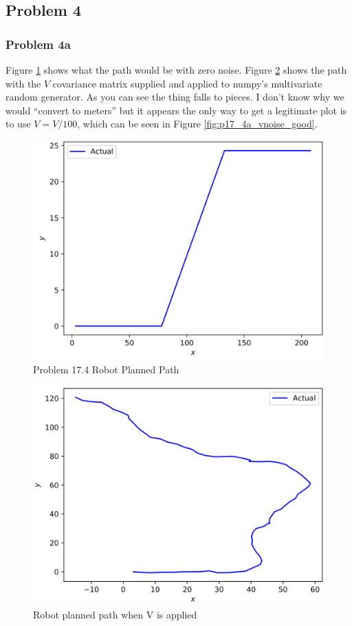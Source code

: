 \documentclass{article}
\begin{document}
\newpage
\subsection{Problem 4}
\subsubsection{Problem 4a}
Figure \ref{fig:p17_4a_planned} shows what the path would be with zero noise. 
Figure \ref{fig:p17_4a_vnoise_bad} shows the path with the $V$ covariance 
matrix supplied and applied to numpy's multivariate random generator. As you can 
see the thing falls to pieces. I don't know why we would ``convert to meters'' 
but it appears the only way to get a legitimate plot is to use $V = V / 100$, 
which can be seen in Figure \ref{fig:p17_4a_vnoise_good}.

\begin{figure}[h]
    \centering
    \includegraphics[scale=0.75]{problem17_4a_pure}
    \caption{Problem 17.4 Robot Planned Path}
    \label{fig:p17_4a_planned}
\end{figure}

\begin{figure}[h]
    \centering
    \includegraphics[scale=0.75]{problem17_4a_Vnoise_bad}
    \caption[Problem 17.4 Robot Planned Path]{Robot planned path when V is applied}
    \label{fig:p17_4a_vnoise_bad}
\end{figure}
\end{document}
